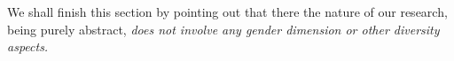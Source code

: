 We shall finish this section by pointing out that there the nature of our research, being purely abstract, \emph{does not involve any gender dimension or other diversity aspects.}





%
